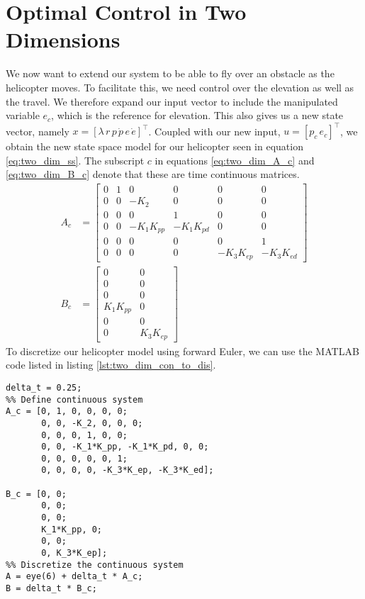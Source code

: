 \section{Optimal Control in Two Dimensions}\label{sec:two_dimensions}
We now want to extend our system to be able to fly over an obstacle as the helicopter moves. To facilitate this, we need control over the elevation as well as the travel. We therefore expand our input vector to include the manipulated variable $e_c$, which is the reference for elevation. This also gives us a new state vector, namely $x = [\lambda\, r\, p\, \dot{p}\, e\, \dot{e}]^\top$. Coupled with our new input, $u = [p_c\, e_c]^\top$, we obtain the new state space model for our helicopter seen in equation \ref{eq:two_dim_ss}. The subscript $c$ in equations \ref{eq:two_dim_A_c} and \ref{eq:two_dim_B_c} denote that these are time continuous matrices.
\begin{subequations}\label{eq:two_dim_ss}
\begin{align}
    \label{eq:two_dim_A_c}
    A_c &= \begin{bmatrix}
        0 & 1 & 0 & 0 & 0 & 0\\
        0 & 0 & -K_2 & 0 & 0 & 0\\
        0 & 0 & 0 & 1 & 0 & 0\\
        0 & 0 & -K_1K_{pp} & -K_1K_{pd} & 0 & 0\\
        0 & 0 & 0 & 0 & 0 & 1\\
        0 & 0 & 0 & 0 & -K_3K_{ep} & -K_3K_{ed}
    \end{bmatrix}\\
    \label{eq:two_dim_B_c}
    B_c &= \begin{bmatrix}
        0 & 0\\
        0 & 0\\
        0 & 0\\
        K_1K_{pp} & 0\\
        0 & 0\\
        0 & K_3K_{ep}
    \end{bmatrix}
\end{align}
\end{subequations}
To discretize our helicopter model using forward Euler, we can use the MATLAB code listed in listing \ref{lst:two_dim_con_to_dis}.
\begin{lstlisting}[caption=Discretization of the continuous model in equation \ref{eq:two_dim_ss}.,label=lst:two_dim_con_to_dis]
%% Time step size 0.25 seconds
delta_t = 0.25;
%% Define continuous system
A_c = [0, 1, 0, 0, 0, 0;
       0, 0, -K_2, 0, 0, 0;
       0, 0, 0, 1, 0, 0;
       0, 0, -K_1*K_pp, -K_1*K_pd, 0, 0;
       0, 0, 0, 0, 0, 1;
       0, 0, 0, 0, -K_3*K_ep, -K_3*K_ed];
   
B_c = [0, 0;
       0, 0;
       0, 0;
       K_1*K_pp, 0;
       0, 0;
       0, K_3*K_ep];
%% Discretize the continuous system
A = eye(6) + delta_t * A_c;
B = delta_t * B_c;
\end{lstlisting}
